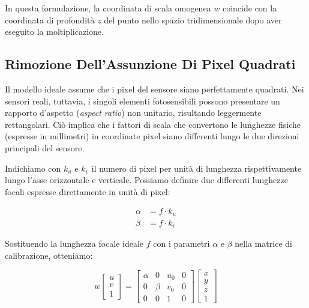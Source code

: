 ﻿\documentclass[11pt, a4paper]{article}
\begin{document}
In questa formulazione, la coordinata di scala omogenea $w$ coincide con la coordinata di profondità $z$ del punto nello spazio tridimensionale dopo aver eseguito la moltiplicazione.



\subsection{Rimozione Dell'Assunzione Di Pixel Quadrati}

Il modello ideale assume che i pixel del sensore siano perfettamente quadrati. Nei sensori reali, tuttavia, i singoli elementi fotosensibili possono presentare un rapporto d'aspetto (\emph{aspect ratio}) non unitario, risultando leggermente rettangolari. Ciò implica che i fattori di scala che convertono le lunghezze fisiche (espresse in millimetri) in coordinate pixel siano differenti lungo le due direzioni principali del sensore.

Indichiamo con $k_u$ e $k_v$ il numero di pixel per unità di lunghezza rispettivamente lungo l'asse orizzontale e verticale. Possiamo definire due differenti lunghezze focali espresse direttamente in unità di pixel:

\begin{align*}
\alpha &= f \cdot k_u \\
\beta &= f \cdot k_v
\end{align*}


Sostituendo la lunghezza focale ideale $f$ con i parametri $\alpha$ e $\beta$ nella matrice di calibrazione, otteniamo:

\begin{equation}
w \begin{bmatrix} u \\ v \\ 1 \end{bmatrix} = \begin{bmatrix} \alpha & 0 & u_0 & 0 \\ 0 & \beta & v_0 & 0 \\ 0 & 0 & 1 & 0 \end{bmatrix} \begin{bmatrix} x \\ y \\ z \\ 1 \end{bmatrix}
\end{equation}
\end{document}
